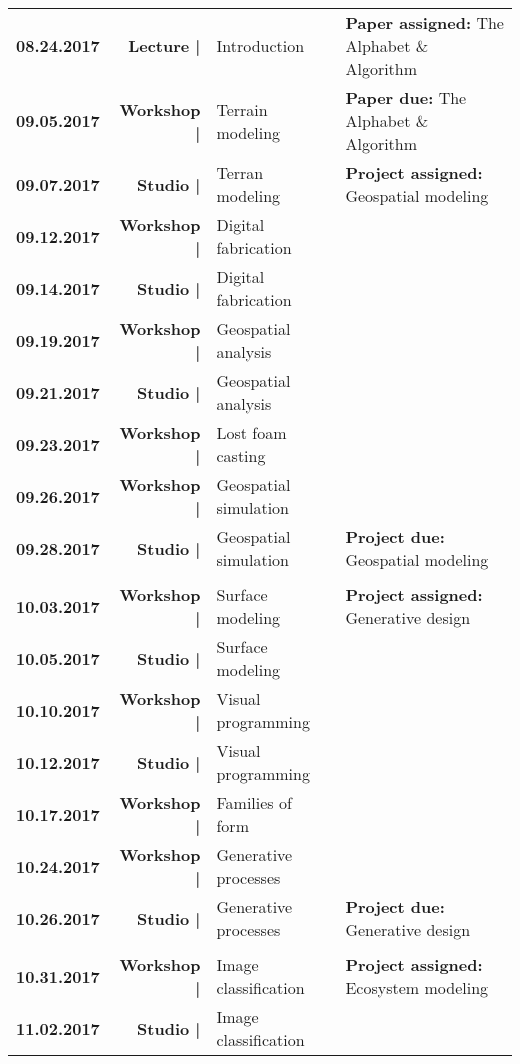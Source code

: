 \documentclass[11pt,article,oneside]{memoir}
\begin{document}
\begin{table}[H]
\small
\begin{tabular}{l r  l @{\hskip 0.5cm} l}
%
\textbf{08.24.2017} & \textbf{Lecture |} & Introduction & \textbf{Paper assigned:} The Alphabet \& Algorithm\\
%
\textbf{09.05.2017} & \textbf{Workshop |} & Terrain modeling & \textbf{Paper due:} The Alphabet \& Algorithm\\
\textbf{09.07.2017} & \textbf{Studio |} & Terran modeling & \textbf{Project assigned:} Geospatial modeling\\
%
\textbf{09.12.2017} & \textbf{Workshop |} & Digital fabrication & \\
\textbf{09.14.2017} & \textbf{Studio |} & Digital fabrication & \\
%
\textbf{09.19.2017} & \textbf{Workshop |} & Geospatial analysis & \\
\textbf{09.21.2017} & \textbf{Studio |} & Geospatial analysis & \\
\textbf{09.23.2017} & \textbf{Workshop |} & Lost foam casting\\
%
\textbf{09.26.2017} & \textbf{Workshop |} & Geospatial simulation & \\
\textbf{09.28.2017} & \textbf{Studio |} & Geospatial simulation  & \textbf{Project due:} Geospatial modeling\\
%
\\
%
\textbf{10.03.2017} & \textbf{Workshop |} & Surface modeling & \textbf{Project assigned:} Generative design\\
\textbf{10.05.2017} & \textbf{Studio |} & Surface modeling & \\
%
\textbf{10.10.2017} & \textbf{Workshop |} & Visual programming & \\
\textbf{10.12.2017} & \textbf{Studio |} & Visual programming & \\
%
\textbf{10.17.2017} & \textbf{Workshop |} & Families of form & \\
%
\textbf{10.24.2017} & \textbf{Workshop |} & Generative processes& \\
\textbf{10.26.2017} & \textbf{Studio |} & Generative processes & \textbf{Project due:} Generative design\\
%
\\
%
\textbf{10.31.2017} & \textbf{Workshop |} & Image classification & \textbf{Project assigned:} Ecosystem modeling\\
\textbf{11.02.2017} & \textbf{Studio |} & Image classification & \\
%



%
\end{tabular}
\end{table}
\end{document}
